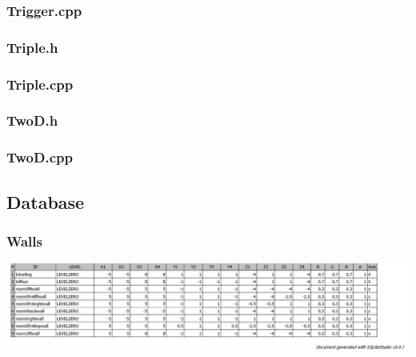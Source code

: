\documentclass{article}
\begin{document}
\subsubsection{Trigger.cpp}
	
	 				
\subsubsection{Triple.h}
	
	 				
\subsubsection{Triple.cpp}
	
	 				
\subsubsection{TwoD.h}
	

\subsubsection{TwoD.cpp}	
	

\subsection{Database}

\subsubsection{Walls}
	\includegraphics[width=18cm]{WALLS}
\end{document}
